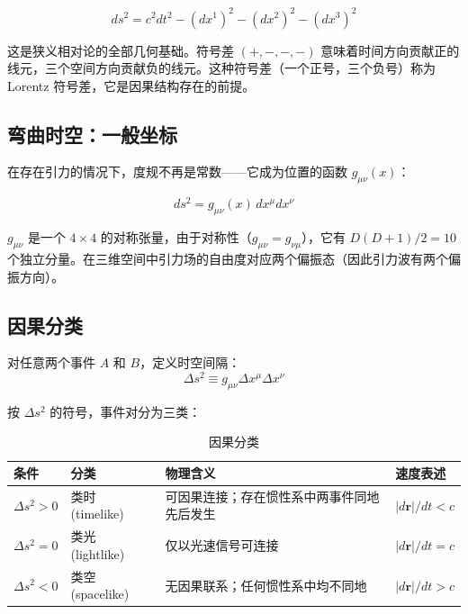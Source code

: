 \begin{equation}
ds^2 = c^2 dt^2 - (dx^1)^2 - (dx^2)^2 - (dx^3)^2
\end{equation}

\noindent 这是狭义相对论的全部几何基础。符号差 $(+,-,-,-)$ 意味着时间方向贡献正的线元，三个空间方向贡献负的线元。这种符号差（一个正号，三个负号）称为 Lorentz 符号差，它是因果结构存在的前提。

\subsection{弯曲时空：一般坐标}

在存在引力的情况下，度规不再是常数——它成为位置的函数 $g_{\mu\nu}(x)$：

\begin{equation}
ds^2 = g_{\mu\nu}(x)\, dx^\mu dx^\nu
\end{equation}

\noindent $g_{\mu\nu}$ 是一个 $4\times4$ 的对称张量，由于对称性（$g_{\mu\nu}=g_{\nu\mu}$），它有 $D(D+1)/2 = 10$ 个独立分量。在三维空间中引力场的自由度对应两个偏振态（因此引力波有两个偏振方向）。

\subsection{因果分类}

对任意两个事件 $A$ 和 $B$，定义时空间隔：
\begin{equation}
\Delta s^2 \equiv g_{\mu\nu} \Delta x^\mu \Delta x^\nu
\end{equation}

\noindent 按 $\Delta s^2$ 的符号，事件对分为三类：

\begin{table}[h]
\centering
\begin{tabular}{p{2.5cm}p{2.5cm}p{4.5cm}p{4cm}}
\toprule
\textbf{条件} & \textbf{分类} & \textbf{物理含义} & \textbf{速度表述} \\
\midrule
$\Delta s^2 > 0$ & 类时 (timelike) & 可因果连接；存在惯性系中两事件同地先后发生 & $|d\mathbf{r}|/dt < c$ \\
$\Delta s^2 = 0$ & 类光 (lightlike) & 仅以光速信号可连接 & $|d\mathbf{r}|/dt = c$ \\
$\Delta s^2 < 0$ & 类空 (spacelike) & 无因果联系；任何惯性系中均不同地 & $|d\mathbf{r}|/dt > c$ \\
\bottomrule
\end{tabular}
\caption{因果分类}
\end{table}

